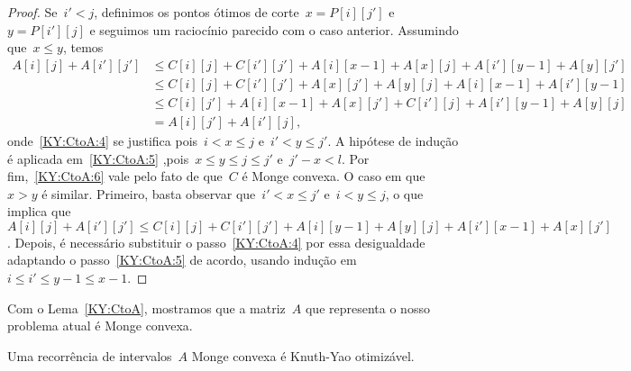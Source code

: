 \begin{proof}
Se~${i' < j}$, definimos os pontos ótimos de corte~${x = P[i][j']}$ e~${y = P[i'][j]}$ e seguimos um raciocínio parecido com o caso anterior. Assumindo que~${x \leq y}$, temos 
\begin{align}
A[i][j] + A[i'][j'] &\leq C[i][j] + C[i'][j'] + A[i][x-1] + A[x][j] + A[i'][y-1] + A[y][j'] \label{KY:CtoA:4} \\
                    &\leq C[i][j] + C[i'][j'] + A[x][j'] + A[y][j] + A[i][x-1] + A[i'][y-1] \label{KY:CtoA:5} \\
                    &\leq C[i][j'] + A[i][x-1] + A[x][j'] + C[i'][j] + A[i'][y-1] + A[y][j] \label{KY:CtoA:6} \\
                    &= A[i][j'] + A[i'][j] \text{,} \nonumber
\end{align}
onde~\eqref{KY:CtoA:4} se justifica pois~${i < x \leq j}$ e~${i' < y \leq j'}$. A hipótese de indução é aplicada em~\eqref{KY:CtoA:5} ,pois~${x \leq y \leq j \leq j'}$ e~${j' - x < l}$. Por fim,~\eqref{KY:CtoA:6} vale pelo fato de que~$C$ é Monge convexa. O caso em que~${x > y}$ é similar. Primeiro, basta observar que~${i' < x \leq j'}$ e~${i < y \leq j}$, o que implica que~${A[i][j] + A[i'][j'] \leq C[i][j] + C[i'][j'] + A[i][y-1] + A[y][j] + A[i'][x-1] + A[x][j']}$. Depois, é necessário substituir o passo~\eqref{KY:CtoA:4} por essa desigualdade adaptando o passo~\eqref{KY:CtoA:5} de acordo, usando indução em~${i \leq i' \leq y - 1 \leq x - 1}$.
\end{proof}

Com o Lema~\ref{KY:CtoA}, mostramos que a matriz~$A$ que representa o nosso problema atual é Monge convexa.

\begin{theo} \label{KY:MCtoKY}
Uma recorrência de intervalos~$A$ Monge convexa é Knuth-Yao otimizável.
\end{theo}

